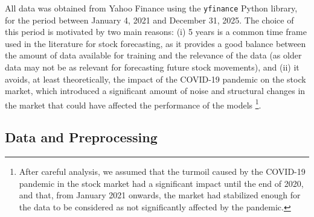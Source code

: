 \documentclass{article}
\begin{document}
All data was obtained from Yahoo Finance using the \texttt{yfinance} Python library, for the period between January 4, 2021 and December 31, 2025. The choice of this period is motivated by two main reasons: (i) 5 years is a common time frame used in the literature for stock forecasting, as it provides a good balance between the amount of data available for training and the relevance of the data (as older data may not be as relevant for forecasting future stock movements), and (ii) it avoids, at least theoretically, the impact of the COVID-19 pandemic on the stock market, which introduced a significant amount of noise and structural changes in the market that could have affected the performance of the models \footnote{After careful analysis, we assumed that the turmoil caused by the COVID-19 pandemic in the stock market had a significant impact until the end of 2020, and that, from January 2021 onwards, the market had stabilized enough for the data to be considered as not significantly affected by the pandemic.}.

\subsection{Data and Preprocessing}
\end{document}
